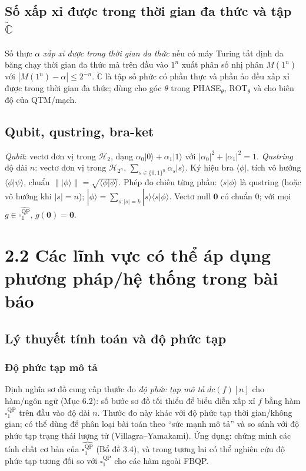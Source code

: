 \documentclass[10pt]{article}
\begin{document}
\subsection*{Số xấp xỉ được trong thời gian đa thức và tập $\tilde{\mathbb{C}}$}
Số thực $\alpha$ \emph{xấp xỉ được trong thời gian đa thức} nếu có máy Turing tất định đa băng chạy thời gian đa thức mà trên đầu vào $1^n$ xuất phân số nhị phân $M(1^n)$ với $|M(1^n)-\alpha|\le 2^{-n}$. $\tilde{\mathbb{C}}$ là tập số phức có phần thực và phần ảo đều xấp xỉ được trong thời gian đa thức; dùng cho góc $\theta$ trong PHASE$_\theta$, ROT$_\theta$ và cho biên độ của QTM/mạch.

\subsection*{Qubit, qustring, bra-ket}
\emph{Qubit}: vectơ đơn vị trong $\mathcal{H}_2$, dạng $\alpha_0|0\rangle+\alpha_1|1\rangle$ với $|\alpha_0|^2+|\alpha_1|^2=1$. \emph{Qustring} độ dài $n$: vectơ đơn vị trong $\mathcal{H}_{2^n}$, $\sum_{s\in\{0,1\}^n}\alpha_s|s\rangle$. Ký hiệu bra $\langle\phi|$, tích vô hướng $\langle\phi|\psi\rangle$, chuẩn $\||\phi\rangle\|=\sqrt{\langle\phi|\phi\rangle}$. Phép đo chiếu từng phần: $\langle s|\phi\rangle$ là qustring (hoặc vô hướng khi $|s|=n$); $|\phi\rangle=\sum_{s:|s|=k}|s\rangle\langle s|\phi\rangle$. Vectơ null $\mathbf{0}$ có chuẩn 0; với mọi $g\in\widehat{\square_1^{\mathrm{QP}}}$, $g(\mathbf{0})=\mathbf{0}$.

\section*{2.2 Các lĩnh vực có thể áp dụng phương pháp/hệ thống trong bài báo}

\subsection*{Lý thuyết tính toán và độ phức tạp}

\subsubsection*{Độ phức tạp mô tả}
Định nghĩa sơ đồ cung cấp thước đo \emph{độ phức tạp mô tả} $dc(f)[n]$ cho hàm/ngôn ngữ (Mục 6.2): số bước sơ đồ tối thiểu để biểu diễn xấp xỉ $f$ bằng hàm $\square_1^{\mathrm{QP}}$ trên đầu vào độ dài $n$. Thước đo này khác với độ phức tạp thời gian/không gian; có thể dùng để phân loại bài toán theo ``sức mạnh mô tả'' và so sánh với độ phức tạp trạng thái lượng tử (Villagra–Yamakami). Ứng dụng: chứng minh các tính chất cơ bản của $\widehat{\square_1^{\mathrm{QP}}}$ (Bổ đề 3.4), và trong tương lai có thể nghiên cứu độ phức tạp tương đối so với $\square_1^{\mathrm{QP}}$ cho các hàm ngoài FBQP.
\end{document}
